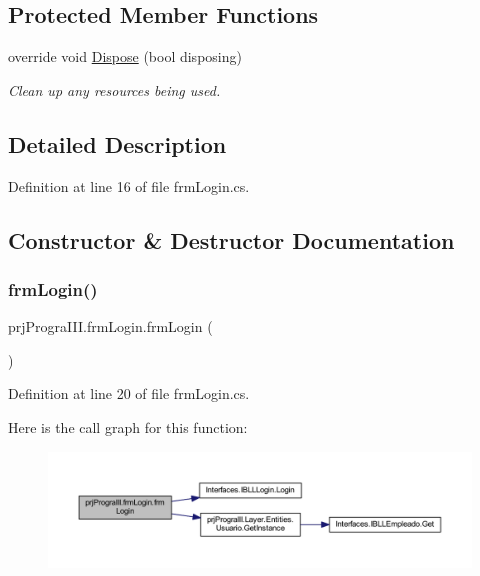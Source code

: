 \subsection*{Protected Member Functions}
\begin{DoxyCompactItemize}
\item 
override void \hyperlink{classprj_progra_i_i_i_1_1frm_login_a27281d040dd63cb757745c28069700d7}{Dispose} (bool disposing)
\begin{DoxyCompactList}\small\item\em Clean up any resources being used. \end{DoxyCompactList}\end{DoxyCompactItemize}


\subsection{Detailed Description}


Definition at line 16 of file frm\+Login.\+cs.



\subsection{Constructor \& Destructor Documentation}
\hypertarget{classprj_progra_i_i_i_1_1frm_login_a0753b9efaeda29b58172159d1c01d3f4}{}\label{classprj_progra_i_i_i_1_1frm_login_a0753b9efaeda29b58172159d1c01d3f4} 
\subsubsection{\texorpdfstring{frm\+Login()}{frmLogin()}}
{\footnotesize\ttfamily prj\+Progra\+I\+I\+I.\+frm\+Login.\+frm\+Login (\begin{DoxyParamCaption}{ }\end{DoxyParamCaption})}



Definition at line 20 of file frm\+Login.\+cs.

Here is the call graph for this function\+:
\nopagebreak
\begin{figure}[H]
\begin{center}
\leavevmode
\includegraphics[width=350pt]{classprj_progra_i_i_i_1_1frm_login_a0753b9efaeda29b58172159d1c01d3f4_cgraph}
\end{center}
\end{figure}


